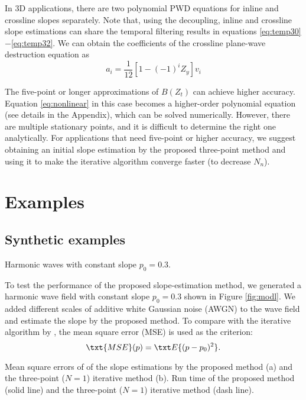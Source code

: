 In 3D applications, there are two polynomial PWD equations 
for inline and crossline slopes separately.
Note that, using the decoupling,
inline and crossline slope estimations can share
the temporal filtering results in equations \ref{eq:temp30}$-$\ref{eq:temp32}.
We can obtain the coefficients of the crossline 
plane-wave destruction equation as
\begin{equation}
a_i=\frac{1}{12}[1-(-1)^iZ_y]v_i
\end{equation}

The five-point or longer approximations of \mbox{$B(Z_t)$} 
can achieve higher accuracy.
Equation \ref{eq:nonlinear} in this case becomes 
a higher-order polynomial equation (see details in the Appendix),
which can be solved numerically.
However, there are multiple stationary points, 
and it is difficult to determine the right one analytically.
For applications that need five-point or higher accuracy,
we suggest obtaining an initial slope estimation by
the proposed three-point method and 
using it to make the iterative algorithm converge faster 
(to decrease \mbox{$N_n$}).

\section{Examples}

\subsection{Synthetic examples}
{Harmonic waves with constant slope $p_0=0.3$.}

To test the performance of the proposed slope-estimation method,
we generated a harmonic wave field with constant slope $p_0=0.3$
shown in Figure \ref{fig:modl}.
We added different scales of additive white Gaussian noise (AWGN) 
to the wave field and estimate the slope by the proposed method.
To compare with the iterative algorithm by \cite{fomel:1946},
the mean square error (MSE) is used as the criterion:
\begin{equation}
\txt{MSE}(p)=\txt E\{(p-p_0)^2\}.
\end{equation}

{Mean square errors of of the slope estimations by 
the proposed method (a) and the three-point ($N=1$) iterative method (b).
}
{
Run time of the proposed method (solid line)
and the three-point ($N=1$) iterative method (dash line).
}

